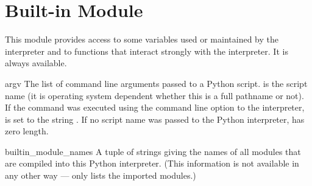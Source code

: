 \section{Built-in Module }
\label{module-sys}

This module provides access to some variables used or maintained by the
interpreter and to functions that interact strongly with the interpreter.
It is always available.


\begin{datadesc}{argv}
  The list of command line arguments passed to a Python script.
   is the script name (it is operating system
  dependent whether this is a full pathname or not).
  If the command was executed using the  command line option
  to the interpreter,  is set to the string
  .
  If no script name was passed to the Python interpreter,
   has zero length.
\end{datadesc}

\begin{datadesc}{builtin_module_names}
  A tuple of strings giving the names of all modules that are compiled
  into this Python interpreter.  (This information is not available in
  any other way ---  only lists the imported
  modules.)
\end{datadesc}


